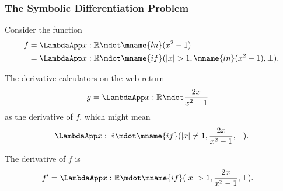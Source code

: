 \documentclass[t,12pt,numbers,fleqn]{beamer}
\begin{document}
\begin{frame}
\frametitle{The Symbolic Differentiation Problem}
\bi

  \item Consider the function 
\begin{align*}
  f &= \LambdaApp x : \mathbb{R} \mdot \mname{ln}(x^2 - 1)\\ 
    &= \LambdaApp x : \mathbb{R} \mdot \mname{if}(|x| > 1, \mname{ln}(x^2 - 1), \bot).
\end{align*}

\pause

  \item The derivative calculators on the web return
\begin{align*}
  g &= \LambdaApp x : \mathbb{R} \mdot \frac{2x}{x^2 - 1}
\end{align*}
as the derivative of $f$, which might mean 
\begin{align*}
\LambdaApp x : \mathbb{R} \mdot \mname{if}(|x| \not= 1, \frac{2x}{x^2
  - 1}, \bot).
\end{align*}

\pause
  
  \item {}  The derivative of $f$ is
\begin{align*}
  f' &= \LambdaApp x : \mathbb{R} \mdot \mname{if}(|x| > 1, \frac{2x}{x^2 - 1}, \bot).
\end{align*}

\ei
\end{frame}

\end{document}
